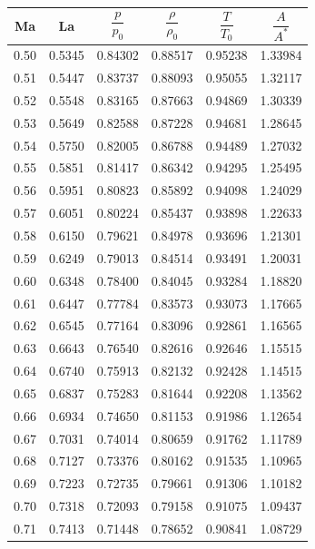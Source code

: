 \begin{minipage}{0.48\textwidth}
    \centering
    \begin{tabular}{c|c|c|c|c|c}
        Ma & La & $\dfrac{p}{p_0}$ & $\dfrac{\rho}{\rho_0}$ & $\dfrac{T}{T_0}$ & $\dfrac{A}{A^*}$ \\[2.2ex] \hline
        0.50 & 0.5345 & 0.84302 & 0.88517 & 0.95238 & 1.33984 \\
        0.51 & 0.5447 & 0.83737 & 0.88093 & 0.95055 & 1.32117 \\
        0.52 & 0.5548 & 0.83165 & 0.87663 & 0.94869 & 1.30339 \\
        0.53 & 0.5649 & 0.82588 & 0.87228 & 0.94681 & 1.28645 \\
        0.54 & 0.5750 & 0.82005 & 0.86788 & 0.94489 & 1.27032 \\
        0.55 & 0.5851 & 0.81417 & 0.86342 & 0.94295 & 1.25495 \\
        0.56 & 0.5951 & 0.80823 & 0.85892 & 0.94098 & 1.24029 \\
        0.57 & 0.6051 & 0.80224 & 0.85437 & 0.93898 & 1.22633 \\
        0.58 & 0.6150 & 0.79621 & 0.84978 & 0.93696 & 1.21301 \\
        0.59 & 0.6249 & 0.79013 & 0.84514 & 0.93491 & 1.20031 \\
        0.60 & 0.6348 & 0.78400 & 0.84045 & 0.93284 & 1.18820 \\
        0.61 & 0.6447 & 0.77784 & 0.83573 & 0.93073 & 1.17665 \\
        0.62 & 0.6545 & 0.77164 & 0.83096 & 0.92861 & 1.16565 \\
        0.63 & 0.6643 & 0.76540 & 0.82616 & 0.92646 & 1.15515 \\
        0.64 & 0.6740 & 0.75913 & 0.82132 & 0.92428 & 1.14515 \\ \arrayrulecolor{Green}\hline\arrayrulecolor{black}
        0.65 & 0.6837 & 0.75283 & 0.81644 & 0.92208 & 1.13562 \\
        0.66 & 0.6934 & 0.74650 & 0.81153 & 0.91986 & 1.12654 \\
        0.67 & 0.7031 & 0.74014 & 0.80659 & 0.91762 & 1.11789 \\
        0.68 & 0.7127 & 0.73376 & 0.80162 & 0.91535 & 1.10965 \\
        0.69 & 0.7223 & 0.72735 & 0.79661 & 0.91306 & 1.10182 \\
        0.70 & 0.7318 & 0.72093 & 0.79158 & 0.91075 & 1.09437 \\
        0.71 & 0.7413 & 0.71448 & 0.78652 & 0.90841 & 1.08729 \\

\end{tabular}
\end{minipage}
